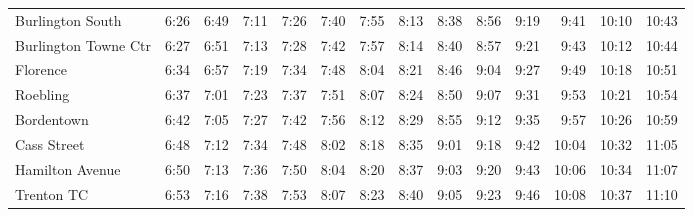 \begin{center}
\begin{tabular}{@{}lrrrrrrrrrrrrr@{}}
Burlington South & 6:26 & 6:49 & 7:11 & 7:26 & 7:40 & 7:55 & 8:13 & 8:38 & 8:56 & 9:19 & 9:41 & 10:10 & 10:43 \\
Burlington Towne Ctr & 6:27 & 6:51 & 7:13 & 7:28 & 7:42 & 7:57 & 8:14 & 8:40 & 8:57 & 9:21 & 9:43 & 10:12 & 10:44 \\
Florence & 6:34 & 6:57 & 7:19 & 7:34 & 7:48 & 8:04 & 8:21 & 8:46 & 9:04 & 9:27 & 9:49 & 10:18 & 10:51 \\
Roebling & 6:37 & 7:01 & 7:23 & 7:37 & 7:51 & 8:07 & 8:24 & 8:50 & 9:07 & 9:31 & 9:53 & 10:21 & 10:54 \\
Bordentown & 6:42 & 7:05 & 7:27 & 7:42 & 7:56 & 8:12 & 8:29 & 8:55 & 9:12 & 9:35 & 9:57 & 10:26 & 10:59 \\
Cass Street & 6:48 & 7:12 & 7:34 & 7:48 & 8:02 & 8:18 & 8:35 & 9:01 & 9:18 & 9:42 & 10:04 & 10:32 & 11:05 \\
Hamilton Avenue & 6:50 & 7:13 & 7:36 & 7:50 & 8:04 & 8:20 & 8:37 & 9:03 & 9:20 & 9:43 & 10:06 & 10:34 & 11:07 \\
Trenton TC & 6:53 & 7:16 & 7:38 & 7:53 & 8:07 & 8:23 & 8:40 & 9:05 & 9:23 & 9:46 & 10:08 & 10:37 & 11:10 \\
\bottomrule\end{tabular}\end{center}
